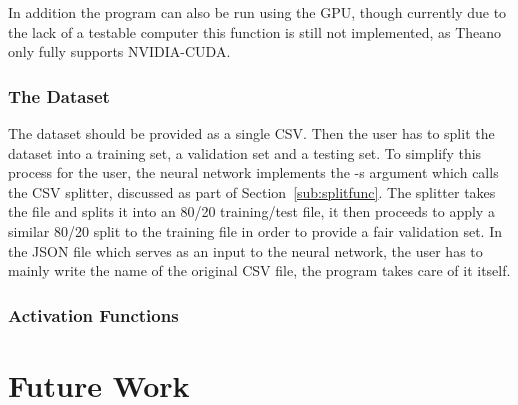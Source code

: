 \documentclass{article}
\begin{document}
In addition the program can also be run using the GPU, though currently due to the lack of a testable computer this function is still not implemented, as Theano only fully supports NVIDIA-CUDA\@.

\subsubsection{The Dataset}
\label{subsub:dataset}

The dataset should be provided as a single CSV\@. Then the user has to split the dataset into a training set, a validation set and a testing set. To simplify this process for the user, the neural network implements the -s argument which calls the CSV splitter, discussed as part of Section~\ref{sub:splitfunc}. The splitter takes the file and splits it into an 80/20 training/test file, it then proceeds to apply a similar 80/20 split to the training file in order to provide a fair validation set. In the JSON file which serves as an input to the neural network, the user has to mainly write the name of the original CSV file, the program takes care of it itself.

\subsubsection{Activation Functions}
\label{subsub:activation_functions}

\section{Future Work}
\label{sec:future_work}
\end{document}
